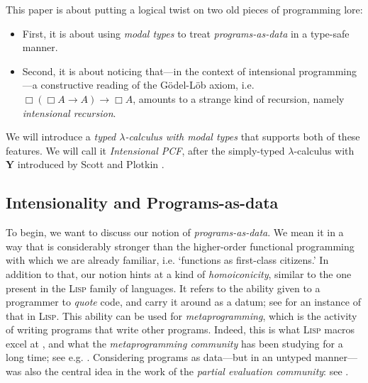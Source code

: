 \documentclass[11pt]{entcs}
\begin{document}
This paper is about putting a logical twist on two old
pieces of programming lore:

\begin{itemize}
  \item
    First, it is about using \emph{modal types} to treat
    \emph{programs-as-data} in a type-safe manner.

  \item
    Second, it is about noticing that---in the context of
    intensional programming---a constructive reading of the
    G\"odel-L\"ob axiom, i.e. $\Box(\Box A \rightarrow A)
    \rightarrow \Box A$, amounts to a strange kind of recursion,
    namely \emph{intensional recursion}.
\end{itemize}

\noindent We will introduce a \emph{typed $\lambda$-calculus with
modal types} that supports both of these features. We will call it
\emph{Intensional PCF}, after the simply-typed $\lambda$-calculus
with $\mathbf{Y}$ introduced by Scott \cite{Scott1993} and Plotkin
\cite{Plotkin1977}.

\subsection{Intensionality and Programs-as-data}

To begin, we want to discuss our notion of
\emph{programs-as-data}. We mean it in a way that is considerably
stronger than the higher-order functional programming with which
we are already familiar, i.e. `functions as first-class
citizens.' In addition to that, our notion hints at a kind of
\emph{homoiconicity}, similar to the one present in the
\textsc{Lisp} family of languages. It refers to the ability given
to a programmer to \emph{quote} code, and carry it around as a
datum; see \cite{Bawden1999} for an instance of that in
\textsc{Lisp}. This ability can be used for
\emph{metaprogramming}, which is the activity of writing programs
that write other programs. Indeed, this is what \textsc{Lisp}
macros excel at \cite{Graham1993}, and what the
\emph{metaprogramming community} has been studying for a long
time; see e.g. \cite{Taha2000,Tsukada2010}. Considering programs as
data---but in an untyped manner---was also the central idea in the
work of the \emph{partial evaluation community}: see
\cite{Jones1993,Jones1996,Jones1997}.
\end{document}
